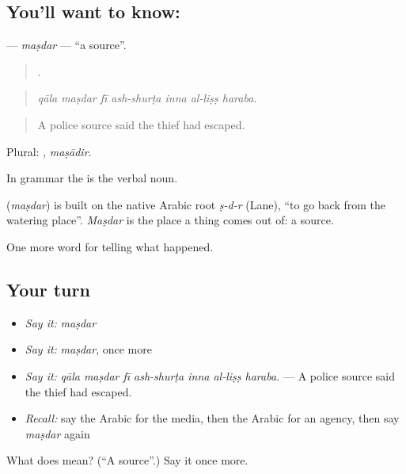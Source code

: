 \subsection*{You'll want to know: }
\textbf{} — \emph{maṣdar} — \textquotedblleft{}a source\textquotedblright{}.

\begin{quote}
      .
\end{quote}

\begin{quote}
\emph{qāla maṣdar fī ash-shurṭa inna al-liṣṣ haraba.}
\end{quote}

\begin{quote}
A police source said the thief had escaped.
\end{quote}

Plural: , \emph{maṣādir}.

In grammar the  is the verbal noun.

\begin{cousinweb}
\textbf{} (\emph{maṣdar}) is built on the native Arabic root \emph{ṣ-d-r} (Lane), \textquotedblleft{}to go back from the watering place\textquotedblright{}. \emph{Maṣdar} is the place a thing comes out of: a source.
\end{cousinweb}

\begin{grammarlens}[title={What you've built}]
One more word for telling what happened.
\end{grammarlens}

\subsection*{Your turn}
\begin{itemize}
\raggedright
  \item \emph{Say it:} \emph{maṣdar}
  \item \emph{Say it:} \emph{maṣdar}, once more
  \item \emph{Say it:} \emph{qāla maṣdar fī ash-shurṭa inna al-liṣṣ haraba.} — A police source said the thief had escaped.
  \item \emph{Recall:} say the Arabic for the media, then the Arabic for an agency, then say \emph{maṣdar} again
\end{itemize}

\begin{tcolorbox}[breakable,colback=teal!4,colframe=teal!35!black,title={Before you move on}]
What does  mean? (\textquotedblleft{}A source\textquotedblright{}.) Say it once more.
\end{tcolorbox}

